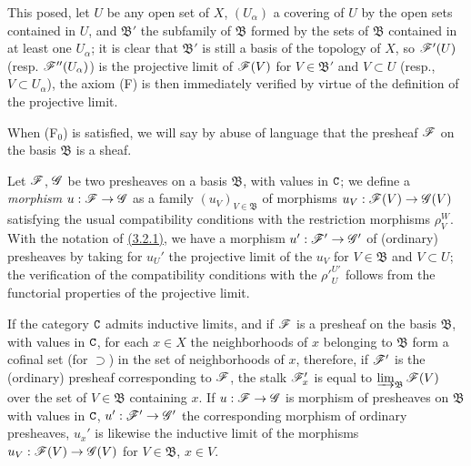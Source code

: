 \begin{env}[3.2.2]
This posed, let $U$ be any open set of $X$, $(U_\alpha)$ a covering of $U$ by
the open sets contained in $U$, and $\mathfrak{B}'$ the subfamily of
$\mathfrak{B}$ formed by the sets
of $\mathfrak{B}$ contained in at least one $U_\alpha$; it is clear that
$\mathfrak{B}'$ is still a basis of the topology of $X$, so $\mathscr{F}'(U)$
(resp. $\mathscr{F}''(U_\alpha)$) is the projective limit of $\mathscr{F}(V)$ for
$V\in\mathfrak{B}'$ and $V\subset U$ (resp., $V\subset U_\alpha$), the axiom (F)
is then immediately verified by virtue of the definition of the projective
limit.

When (F$_0$) is satisfied, we will say by abuse of language that the presheaf
$\mathscr{F}$ on the basis $\mathfrak{B}$ is a sheaf.
\end{env}

\begin{env}[3.2.3]
\label{0.3.2.3}
Let $\mathscr{F}$, $\mathscr{G}$ be two presheaves on a basis $\mathfrak{B}$, with values
in $\mathtt{C}$; we define a {\em morphism} $u:\mathscr{F}\to\mathscr{G}$ as a family
$(u_V)_{V\in\mathfrak{B}}$ of morphisms $u_V:\mathscr{F}(V)\to\mathscr{G}(V)$ satisfying
the usual compatibility conditions with the restriction morphisms $\rho_V^W$.
With the notation of \hyperref[0.3.2.1]{(3.2.1)}, we have a morphism
$u':\mathscr{F}'\to\mathscr{G}'$ of (ordinary) presheaves by taking for $u_U'$ the
projective limit of the $u_V$ for $V\in\mathfrak{B}$ and $V\subset U$; the
verification of the compatibility conditions with the ${\rho'}_U^{U'}$ follows
from the functorial properties of the projective limit.
\end{env}

\begin{env}[3.2.4]
\label{0.3.2.4}
If the category $\mathtt{C}$ admits inductive limits, and if $\mathscr{F}$ is a presheaf on
the basis $\mathfrak{B}$, with values in $\mathtt{C}$, for each $x\in X$ the
neighborhoods of $x$ belonging to $\mathfrak{B}$ form a cofinal set
(for $\supset$) in the set of neighborhoods of $x$, therefore, if $\mathscr{F}'$ is
the (ordinary) presheaf corresponding to $\mathscr{F}$, the stalk $\mathscr{F}_x'$ is
equal to $\varinjlim_{\mathfrak{B}}\mathscr{F}(V)$ over the set of $V\in\mathfrak{B}$
containing $x$. If $u:\mathscr{F}\to\mathscr{G}$ is morphism of presheaves on
$\mathfrak{B}$ with values in $\mathtt{C}$, $u':\mathscr{F}'\to\mathscr{G}'$ the corresponding
morphism of ordinary presheaves, $u_x'$ is likewise the inductive limit of the
morphisms $u_V:\mathscr{F}(V)\to\mathscr{G}(V)$ for $V\in\mathfrak{B}$, $x\in V$.
\end{env}

